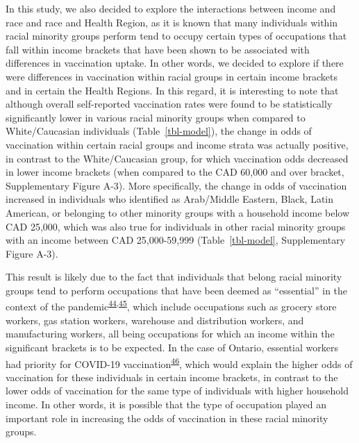 \documentclass[
  letterpaper,
  DIV=11,
  numbers=noendperiod]{scrartcl}
\begin{document}
In this study, we also decided to explore the interactions between
income and race and race and Health Region, as it is known that many
individuals within racial minority groups perform tend to occupy certain
types of occupations that fall within income brackets that have been
shown to be associated with differences in vaccination uptake. In other
words, we decided to explore if there were differences in vaccination
within racial groups in certain income brackets and in certain the
Health Regions. In this regard, it is interesting to note that although
overall self-reported vaccination rates were found to be statistically
significantly lower in various racial minority groups when compared to
White/Caucasian individuals (Table~\ref{tbl-model}), the change in odds
of vaccination within certain racial groups and income strata was
actually positive, in contrast to the White/Caucasian group, for which
vaccination odds decreased in lower income brackets (when compared to
the CAD 60,000 and over bracket, Supplementary Figure A-3). More
specifically, the change in odds of vaccination increased in individuals
who identified as Arab/Middle Eastern, Black, Latin American, or
belonging to other minority groups with a household income below CAD
25,000, which was also true for individuals in other racial minority
groups with an income between CAD 25,000-59,999 (Table~\ref{tbl-model},
Supplementary Figure A-3).

This result is likely due to the fact that individuals that belong
racial minority groups tend to perform occupations that have been deemed
as ``essential'' in the context of the
pandemic\textsuperscript{\protect\hyperlink{ref-hawkins2020}{44},\protect\hyperlink{ref-ct2021}{45}},
which include occupations such as grocery store workers, gas station
workers, warehouse and distribution workers, and manufacturing workers,
all being occupations for which an income within the significant
brackets is to be expected. In the case of Ontario, essential workers
had priority for COVID-19
vaccination\textsuperscript{\protect\hyperlink{ref-mishra2021}{46}},
which would explain the higher odds of vaccination for these individuals
in certain income brackets, in contrast to the lower odds of vaccination
for the same type of individuals with higher household income. In other
words, it is possible that the type of occupation played an important
role in increasing the odds of vaccination in these racial minority
groups.
\end{document}

